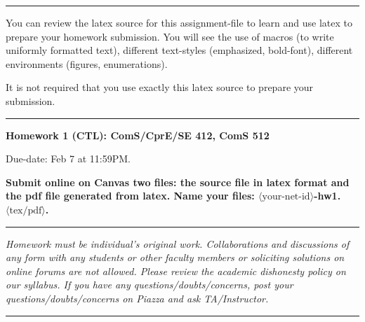 \documentclass[11pt]{article}
\begin{document}
\hrule
\smallskip

\noindent
You can review the latex source for this assignment-file to
learn and use latex to prepare your homework submission. You will see
the use of macros (to write uniformly formatted text), different
text-styles (emphasized, bold-font), different environments (figures,
enumerations).

It is not required that you use exactly this latex source to prepare
your submission. 
\smallskip
\hrule


\begin{center}
{\Large\bf Homework 1 (CTL): ComS/CprE/SE 412, ComS 512}

\medskip

Due-date: Feb 7 at 11:59PM.

\medskip


\end{center}

\noindent
\textbf{
Submit online on Canvas two files: the source file in latex format and
the pdf file generated from latex. Name your files:
$\langle\mbox{your-net-id}\rangle$-hw1.$\langle\mbox{tex/pdf}\rangle$.
}

\hrule
\noindent
\smallskip

\emph{ Homework must be individual's original work. Collaborations and
  discussions of any form with any students or other faculty members
  or soliciting solutions on online forums are not allowed. Please
  review the academic dishonesty policy on our syllabus. If you have
  any questions/doubts/concerns, post your questions/doubts/concerns
  on Piazza and ask TA/Instructor.}

\smallskip
\hrule
\end{document}
